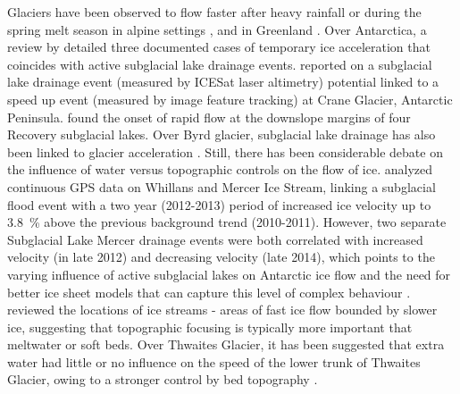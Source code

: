Glaciers have been observed to flow faster after heavy rainfall or during the spring melt season in alpine settings \citep[e.g.][]{IkenUpliftUnteraargletscherBeginning1983}, and in Greenland \citep{ZwallySurfaceMeltInducedAcceleration2002}.
Over Antarctica, a review by \citet{Frickerdecadeprogressobserving2016} detailed three documented cases of temporary ice acceleration that coincides with active subglacial lake drainage events.
\citet{Scambostriggeringsubglaciallake2011} reported on a subglacial lake drainage event (measured by ICESat laser altimetry) potential linked to a speed up event (measured by image feature tracking) at Crane Glacier, Antarctic Peninsula.
\citet{BellLargesubglaciallakes2007} found the onset of rapid flow at the downslope margins of four Recovery subglacial lakes.
Over Byrd glacier, subglacial lake drainage has also been linked to glacier acceleration \citep{StearnsIncreasedflowspeed2008,WrightSubglacialhydrologicalconnectivity2014}.
Still, there has been considerable debate on the influence of water versus topographic controls on the flow of ice.
\citet{SiegfriedEpisodicicevelocity2016} analyzed continuous GPS data on Whillans and Mercer Ice Stream, linking a subglacial flood event with a two year (2012-2013) period of increased ice velocity up to \SI{3.8}{\percent} above the previous background trend (2010-2011).
However, two separate Subglacial Lake Mercer drainage events were both correlated with increased velocity (in late 2012) and decreasing velocity (late 2014), which points to the varying influence of active subglacial lakes on Antarctic ice flow and the need for better ice sheet models that can capture this level of complex behaviour \citep{SiegfriedEpisodicicevelocity2016}.
\citet{WinsborrowWhatcontrolslocation2010} reviewed the locations of ice streams - areas of fast ice flow bounded by slower ice, suggesting that topographic focusing is typically more important that meltwater or soft beds.
Over Thwaites Glacier, it has been suggested that extra water had little or no influence on the speed of the lower trunk of Thwaites Glacier, owing to a stronger control by bed topography \citep{SmithConnectedsubglaciallake2017,HoffmanBriefCommunicationHeterogenous2020}.
